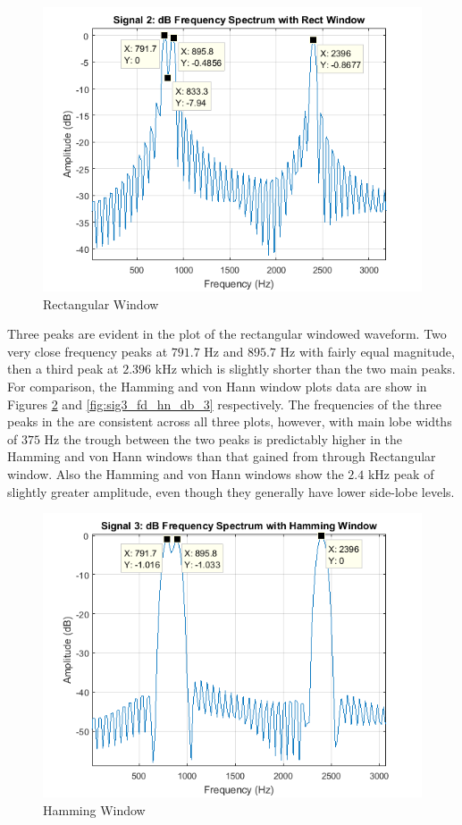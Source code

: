 \documentclass[pdftex, 10pt]{IEEEtran}
\begin{document}
\begin{figure}
    \centering
    \includegraphics[scale=0.5]{sig3_fd_rt_db_3}
    \caption{Rectangular Window}
    \label{fig:sig3_fd_rt_db_3}
\end{figure}

Three peaks are evident in the plot of the rectangular windowed waveform. Two very close frequency
peaks at $791.7$ Hz and $895.7$ Hz with fairly equal magnitude, then a third peak at $2.396$ kHz
which is slightly shorter than the two main peaks. For comparison, the Hamming and von Hann
window plots data are show in Figures \ref{fig:sig3_fd_hm_db_3} and \ref{fig:sig3_fd_hn_db_3} respectively. 
The frequencies of the three peaks in the are consistent across all three plots, however, 
with main lobe widths of $375$ Hz the trough between the two peaks
is predictably higher in the Hamming and von Hann windows than that gained from 
through Rectangular window. Also the Hamming and von Hann windows show the $2.4$ kHz peak of 
slightly greater amplitude, even though they generally have lower side-lobe levels.

\begin{figure}
    \centering
    \includegraphics[scale=0.5]{sig3_fd_hm_db_3}
    \caption{Hamming Window}
    \label{fig:sig3_fd_hm_db_3}
\end{figure}
\end{document}
